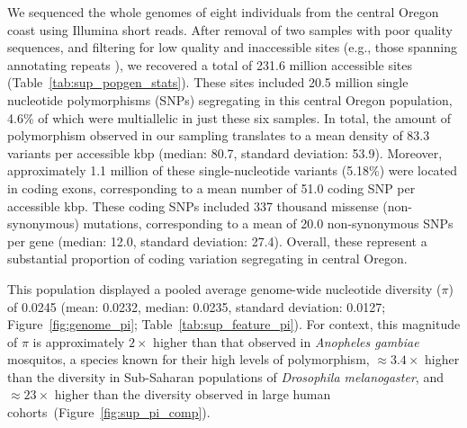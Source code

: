 We sequenced the whole genomes of eight \bgla{} individuals from the central Oregon coast
using Illumina short reads.
After removal of two samples with poor quality sequences, and filtering for low quality
and inaccessible sites (e.g., those spanning annotating repeats ),
we recovered a total of 231.6 million accessible sites (Table~\ref{tab:sup_popgen_stats}).
These sites included 20.5 million single nucleotide polymorphisms (SNPs) segregating in
this central Oregon population, 4.6\% of which were multiallelic in just these six samples.
In total, the amount of polymorphism observed in our sampling translates to a mean density
of 83.3 variants per accessible kbp (median: 80.7, standard deviation: 53.9).
Moreover, approximately 1.1 million of these single-nucleotide variants (5.18\%) were
located in coding exons, corresponding to a mean number of 51.0 coding SNP per accessible kbp.
These coding SNPs included 337 thousand missense (non-synonymous) mutations,
corresponding to a mean of 20.0 non-synonymous SNPs per gene
(median: 12.0, standard deviation: 27.4).
Overall, these represent a substantial proportion of coding variation segregating in
central Oregon.
\vspace{0.1cm}

This \bgla{} population displayed a pooled average genome-wide nucleotide
diversity ($\pi$) of 0.0245 (mean: 0.0232, median: 0.0235, standard deviation: 0.0127;
Figure~\ref{fig:genome_pi}; Table~\ref{tab:sup_feature_pi}).
For context, this magnitude of $\pi$ is approximately $2\times$ higher than that
observed in \textit{Anopheles gambiae} mosquitos, a species known for their high
levels of polymorphism, $\approx3.4\times$ higher than the diversity in Sub-Saharan
populations of \textit{Drosophila melanogaster}, and $\approx23\times$ higher than the
diversity observed in large human cohorts~(Figure~\ref{fig:sup_pi_comp}).
\vspace{0.1cm}

